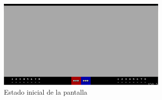 \begin{enumerate}
\begin{figure}[h]
  \centering
    \includegraphics[width=0.75\textwidth]{imagenes/pantallainicial.png}
  \caption{Estado inicial de la pantalla}
  \label{fig:pantalla}
\end{figure}
 \FloatBarrier

\end{enumerate}